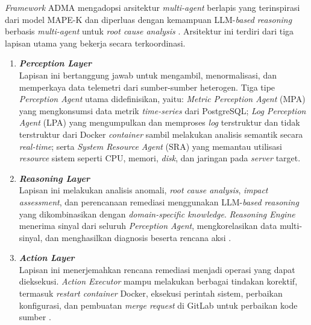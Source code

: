 \textit{Framework} ADMA mengadopsi arsitektur \textit{multi-agent} berlapis yang terinspirasi dari model MAPE-K \cite{kephart2003vision} dan diperluas dengan kemampuan LLM-\textit{based} \textit{reasoning} berbasis \textit{multi-agent} untuk \textit{root cause analysis} \cite{fu2025leveraging}. Arsitektur ini terdiri dari tiga lapisan utama yang bekerja secara terkoordinasi.

\begin{enumerate}[label=\arabic*., leftmargin=*]
  \item \textbf{\textit{Perception Layer}}\\
  Lapisan ini bertanggung jawab untuk mengambil, menormalisasi, dan memperkaya data telemetri dari sumber-sumber heterogen. Tiga tipe \textit{Perception Agent} utama didefinisikan, yaitu: \textit{Metric Perception Agent} (MPA) yang mengkonsumsi data metrik \textit{time-series} dari PostgreSQL; \textit{Log Perception Agent} (LPA) yang mengumpulkan dan memproses \textit{log} terstruktur dan tidak terstruktur dari Docker \textit{container} sambil melakukan analisis semantik secara \textit{real-time}; serta \textit{System Resource Agent} (SRA) yang memantau utilisasi \textit{resource} sistem seperti CPU, memori, \textit{disk}, dan jaringan pada \textit{server} target.

  \item \textbf{\textit{Reasoning Layer}}\\
  Lapisan ini melakukan analisis anomali, \textit{root cause analysis}, \textit{impact assessment}, dan perencanaan remediasi menggunakan LLM-\textit{based} \textit{reasoning} yang dikombinasikan dengan \textit{domain-specific knowledge}. \textit{Reasoning Engine} menerima sinyal dari seluruh \textit{Perception Agent}, mengkorelasikan data multi-sinyal, dan menghasilkan diagnosis beserta rencana aksi \cite{fu2025leveraging}.

  \item \textbf{\textit{Action Layer}}\\
  Lapisan ini menerjemahkan rencana remediasi menjadi operasi yang dapat dieksekusi. \textit{Action Executor} mampu melakukan berbagai tindakan korektif, termasuk \textit{restart container} Docker, eksekusi perintah sistem, perbaikan konfigurasi, dan pembuatan \textit{merge request} di GitLab untuk perbaikan kode sumber \cite{brodimas2025intent}.
\end{enumerate}

